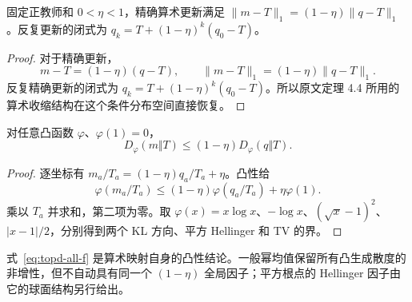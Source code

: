 \begin{proposition}[算术教师的精确收缩与闭式外层]
固定正教师和 $0<\eta<1$，精确算术更新满足 $\|m-T\|_1=(1-\eta)\|q-T\|_1$。反复更新的闭式为 $q_k=T+(1-\eta)^k(q_0-T)$。
\end{proposition}
\begin{proof}
对于精确更新，
\begin{equation}
m-T=(1-\eta)(q-T),\qquad
\|m-T\|_1=(1-\eta)\|q-T\|_1.
\end{equation}
反复精确更新的闭式为 $q_k=T+(1-\eta)^k(q_0-T)$。所以原文定理 4.4 所用的算术收缩结构在这个条件分布空间直接恢复。
\end{proof}

\begin{proposition}[算术端点的凸散度收缩]
对任意凸函数 $\varphi$、$\varphi(1)=0$，
\begin{equation}
D_\varphi(m\Vert T)\le(1-\eta)D_\varphi(q\Vert T).
\label{eq:topd-all-f}
\end{equation}
\end{proposition}
\begin{proof}
逐坐标有 $m_a/T_a=(1-\eta)q_a/T_a+\eta$。凸性给
\begin{equation}
\varphi(m_a/T_a)
\le(1-\eta)\varphi(q_a/T_a)+\eta\varphi(1).
\end{equation}
乘以 $T_a$ 并求和，第二项为零。取 $\varphi(x)=x\log x$、$-\log x$、$(\sqrt x-1)^2$、$|x-1|/2$，分别得到两个 KL 方向、平方 Hellinger 和 TV 的界。
\end{proof}

式~\eqref{eq:topd-all-f} 是算术映射自身的凸性结论。一般幂均值保留所有凸生成散度的非增性，但不自动具有同一个 $(1-\eta)$ 全局因子；平方根点的 Hellinger 因子由它的球面结构另行给出。

